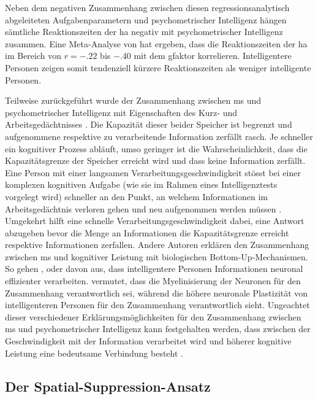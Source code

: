 \documentclass[11pt, twoside, a4paper]{book}		%
\begin{document}
Neben dem negativen Zusammenhang zwischen diesen regressionsanalytisch abgeleiteten Aufgabenparametern und psychometrischer Intelligenz hängen sämtliche  Reaktionszeiten der \gls{ha} negativ mit psychometrischer Intelligenz zusammen. Eine Meta-Analyse von \citet{Sheppard2008} hat ergeben, dass die Reaktionszeiten der \gls{ha} im Bereich von $r=-.22$ bis $-.40$ mit dem \gls{gfaktor} korrelieren. Intelligentere Personen zeigen somit tendenziell kürzere Reaktionszeiten als weniger intelligente Personen. 

Teilweise zurückgeführt wurde der Zusammenhang zwischen \gls{ms} und psychometrischer Intelligenz mit Eigenschaften des Kurz- und Arbeitsgedächtnisses \citep[z. B.][]{Jensen1982a, Jensen1982b, Jensen2006, Vernon1983}. Die Kapazität dieser beider Speicher ist begrenzt und aufgenommene respektive zu verarbeitende Information zerfällt rasch. Je schneller ein kognitiver Prozess abläuft, umso geringer ist die Wahrscheinlichkeit, dass die Kapazitätsgrenze der Speicher erreicht wird und dass keine Information zerfällt. Eine Person mit einer langsamen Verarbeitungsgeschwindigkeit stösst bei einer komplexen kognitiven Aufgabe (wie sie im Rahmen eines Intelligenztests vorgelegt wird) schneller an den Punkt, an welchem Informationen im Arbeitsgedächtnis verloren gehen und neu aufgenommen werden müssen \citep{Lehrl1988, Lehrl1990}. Umgekehrt hilft eine schnelle Verarbeitungsgeschwindigkeit dabei, eine Antwort abzugeben bevor die Menge an Informationen die Kapazitätsgrenze erreicht respektive Informationen zerfallen.
Andere Autoren erklären den Zusammenhang zwischen \gls{ms} und kognitiver Leistung mit biologischen Bot\-tom-Up-Mech\-an\-is\-men. So gehen \citet{Bates1995}, \citet{Hendrickson1980} oder \citet{Reed1992} davon aus, dass intelligentere Personen Informationen neuronal effizienter verarbeiten. \citet{Miller1994} vermutet, dass die Myelinisierung der Neuronen für den Zusammenhang verantwortlich sei, während \citet{Garlick2002} die höhere neuronale Plastizität von intelligenteren Personen für den Zusammenhang verantwortlich sieht. Ungeachtet dieser verschiedener Erklärungsmöglichkeiten für den Zusammenhang zwischen \gls{ms} und psychometrischer Intelligenz kann festgehalten werden, dass zwischen der Geschwindigkeit mit der Information verarbeitet wird und höherer kognitive Leistung eine bedeutsame Verbindung besteht  \citep[auf manifester wie auch auf latenter Ebene;][]{Neubauer1996, Sheppard2008}.



\subsection{Der Spatial-Suppression-Ansatz}
\end{document}
